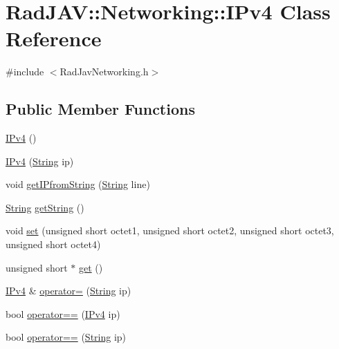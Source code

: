 \hypertarget{class_rad_j_a_v_1_1_networking_1_1_i_pv4}{}\section{Rad\+J\+AV\+:\+:Networking\+:\+:I\+Pv4 Class Reference}
\label{class_rad_j_a_v_1_1_networking_1_1_i_pv4}


{\ttfamily \#include $<$Rad\+Jav\+Networking.\+h$>$}

\subsection*{Public Member Functions}
\begin{DoxyCompactItemize}
\item 
\mbox{\hyperlink{class_rad_j_a_v_1_1_networking_1_1_i_pv4_a5618bbf3d166d86ded140439fec1b82f}{I\+Pv4}} ()
\item 
\mbox{\hyperlink{class_rad_j_a_v_1_1_networking_1_1_i_pv4_ab139354fc0a0d28ddcae43dc53932ef3}{I\+Pv4}} (\mbox{\hyperlink{class_rad_j_a_v_1_1_string}{String}} ip)
\item 
void \mbox{\hyperlink{class_rad_j_a_v_1_1_networking_1_1_i_pv4_af1ad0c90ed3f6a590bfd7b1de617a699}{get\+I\+Pfrom\+String}} (\mbox{\hyperlink{class_rad_j_a_v_1_1_string}{String}} line)
\item 
\mbox{\hyperlink{class_rad_j_a_v_1_1_string}{String}} \mbox{\hyperlink{class_rad_j_a_v_1_1_networking_1_1_i_pv4_a6c418be8e5836120e69f32e051c1ca8b}{get\+String}} ()
\item 
void \mbox{\hyperlink{class_rad_j_a_v_1_1_networking_1_1_i_pv4_adb180130cd11789b4d2a9e3861e50357}{set}} (unsigned short octet1, unsigned short octet2, unsigned short octet3, unsigned short octet4)
\item 
unsigned short $\ast$ \mbox{\hyperlink{class_rad_j_a_v_1_1_networking_1_1_i_pv4_a685dcb26040092474de0f7b13f27a1ee}{get}} ()
\item 
\mbox{\hyperlink{class_rad_j_a_v_1_1_networking_1_1_i_pv4}{I\+Pv4}} \& \mbox{\hyperlink{class_rad_j_a_v_1_1_networking_1_1_i_pv4_a51d7c276754d08bdc3108eb1270e53ad}{operator=}} (\mbox{\hyperlink{class_rad_j_a_v_1_1_string}{String}} ip)
\item 
bool \mbox{\hyperlink{class_rad_j_a_v_1_1_networking_1_1_i_pv4_a09f3a2a9584caa6295f769a504c58892}{operator==}} (\mbox{\hyperlink{class_rad_j_a_v_1_1_networking_1_1_i_pv4}{I\+Pv4}} ip)
\item 
bool \mbox{\hyperlink{class_rad_j_a_v_1_1_networking_1_1_i_pv4_a7b8886f9baff97314612acda23c4e1ef}{operator==}} (\mbox{\hyperlink{class_rad_j_a_v_1_1_string}{String}} ip)
\end{DoxyCompactItemize}
